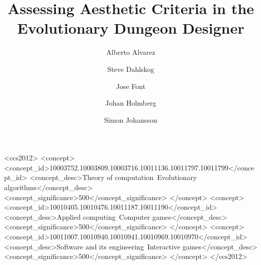\documentclass[sigconf]{acmart}
\begin{document}

\title{Assessing Aesthetic Criteria in the Evolutionary Dungeon Designer}


\author{Alberto Alvarez}

\author{Steve Dahlskog}

\author{Jose Font}

\author{Johan Holmberg}

\author{Simon Johansson}


\renewcommand{\shortauthors}{A. Alvarez et al.}




%
%
 \begin{CCSXML}
<ccs2012>
<concept>
<concept_id>10003752.10003809.10003716.10011136.10011797.10011799</concept_id>
<concept_desc>Theory of computation~Evolutionary algorithms</concept_desc>
<concept_significance>500</concept_significance>
</concept>
<concept>
<concept_id>10010405.10010476.10011187.10011190</concept_id>
<concept_desc>Applied computing~Computer games</concept_desc>
<concept_significance>500</concept_significance>
</concept>
<concept>
<concept_id>10011007.10010940.10010941.10010969.10010970</concept_id>
<concept_desc>Software and its engineering~Interactive games</concept_desc>
<concept_significance>500</concept_significance>
</concept>
</ccs2012>
\end{CCSXML}
\end{document}
